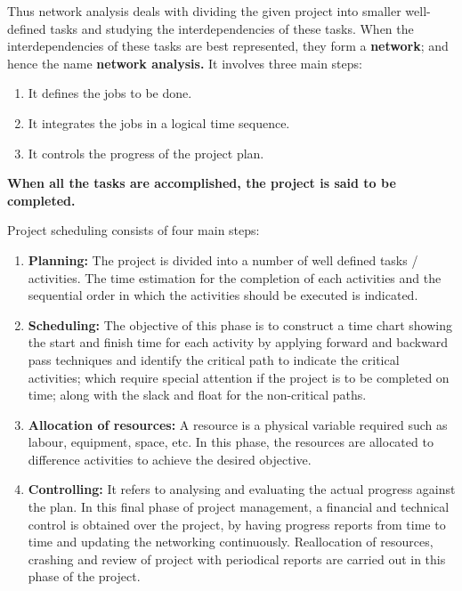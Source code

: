\documentclass[oneside,11pt,pdftex]{book}%
\numberwithin{equation}{section}
\numberwithin{section}{chapter}
\numberwithin{equation}{chapter}
\begin{document}
\par Thus network analysis deals with dividing the given project into smaller well-defined tasks and studying the interdependencies of these tasks. When the interdependencies of these tasks are best represented, they form a \textbf{network}; and hence the name \textbf{network analysis.} It involves three main steps:
\begin{enumerate}
	\item It defines the jobs to be done.
	\item It integrates the jobs in a logical time sequence.
	\item It controls the progress of the project plan.
\end{enumerate}
\textbf{When all the tasks are accomplished, the project is said to be completed.}
\par

Project scheduling consists of four main steps:
\begin{enumerate}
	\item \textbf{Planning: } The project is divided into a number of well defined tasks / activities. The time estimation for the completion of each activities and the sequential order in which the activities should be executed is indicated.
	
	\item \textbf{Scheduling: }The objective of this phase is to construct a time chart showing the start and finish time for each activity by applying forward and backward pass techniques and identify the critical path to indicate the critical activities; which require special attention if the project is to be completed on time; along with the slack and float for the non-critical paths.
	
	\item \textbf{Allocation of resources: } A resource is a physical variable required such as labour, equipment, space, etc. In this phase, the resources are allocated to difference activities to achieve the desired objective.
	
	\item \textbf{Controlling: }It refers to analysing and evaluating the actual progress against the plan. In this final phase of project management, a financial and technical control is obtained over the project, by having progress reports from time to time and updating the networking continuously. Reallocation of resources, crashing and review of project with periodical reports are carried out in this phase of the project.
	
	
\end{enumerate}
\end{document}
